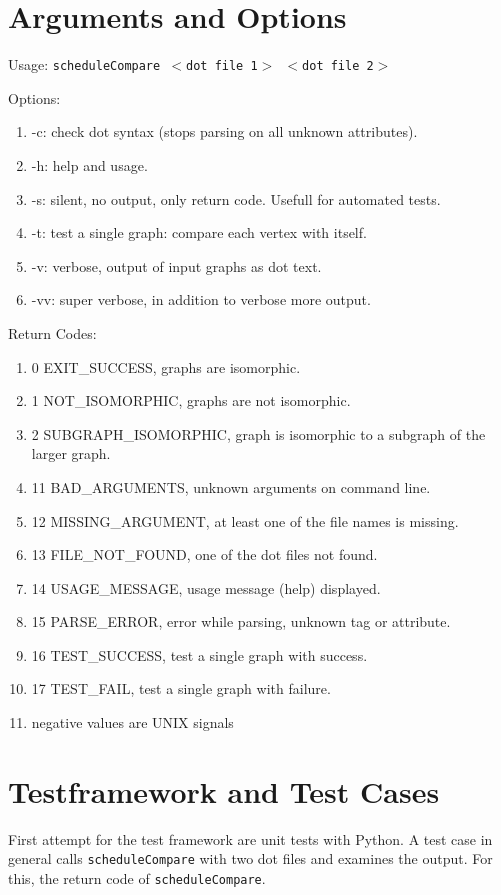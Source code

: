 \documentclass[12pt,a4paper]{report}
\begin{document}
\chapter{Arguments and Options}
Usage: \texttt{scheduleCompare $<$dot file 1$>$ $<$dot file 2$>$}

Options:
\begin{enumerate}
  \item -c: check dot syntax (stops parsing on all unknown attributes).
  \item -h: help and usage.
  \item -s: silent, no output, only return code. Usefull for automated tests.
  \item -t: test a single graph: compare each vertex with itself.
  \item -v: verbose, output of input graphs as dot text.
  \item -vv: super verbose, in addition to verbose more output.
\end{enumerate}

Return Codes:
\begin{enumerate}
  \item 0 EXIT\_SUCCESS, graphs are isomorphic.
  \item 1 NOT\_ISOMORPHIC, graphs are not isomorphic.
  \item 2 SUBGRAPH\_ISOMORPHIC, graph is isomorphic to a subgraph of the larger graph.
  \item 11 BAD\_ARGUMENTS, unknown arguments on command line.
  \item 12 MISSING\_ARGUMENT, at least one of the file names is missing.
  \item 13 FILE\_NOT\_FOUND, one of the dot files not found.
  \item 14 USAGE\_MESSAGE, usage message (help) displayed.
  \item 15 PARSE\_ERROR, error while parsing, unknown tag or attribute.
  \item 16 TEST\_SUCCESS, test a single graph with success.
  \item 17 TEST\_FAIL, test a single graph with failure.
  \item negative values are UNIX signals
\end{enumerate}

\chapter{Testframework and Test Cases}
First attempt for the test framework are unit tests with Python. A test case in general calls \texttt{scheduleCompare} with two dot files and examines the output. For this, the return code of \texttt{scheduleCompare}.
\end{document}
